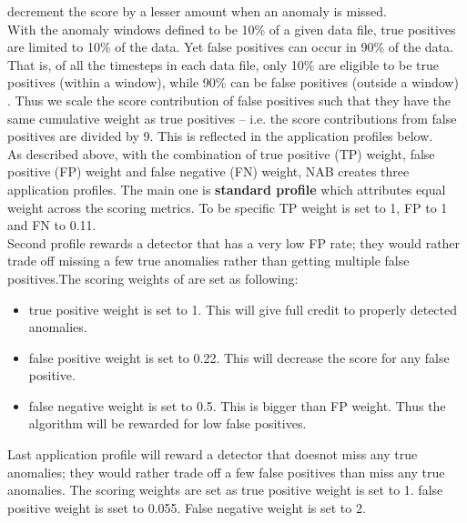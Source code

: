 \documentclass[12pt]{article}
\begin{document}
decrement the score by a lesser amount when an anomaly is missed.\\
\break
With the anomaly windows defined to be 10\% of a given data file, true positives are limited to 10\% of the data. Yet false positives can
occur in 90\% of the data. That is, of all the timesteps in each data file, only 10\%
are eligible to be true positives (within a window), while 90\% can be false
positives (outside a window) . Thus we scale the score contribution of false
positives such that they have the same cumulative weight as true positives – i.e.
the score contributions from false positives are divided by 9. This is reflected in
the application profiles below.\\
\break
As described above, with the combination of true positive (TP) weight, false positive (FP) weight and false negative (FN) weight, NAB creates three application profiles. The main one is \textbf{standard profile} which attributes equal weight
across the scoring metrics. To be specific TP weight is set to 1, FP to 1 and FN to 0.11. \\
\break
Second profile rewards a detector that has a
very low FP rate; they would rather trade off missing a few true anomalies rather
than getting multiple false positives.The scoring weights of are set as following:
\begin{itemize}
\item true positive weight is set to 1. This will give full credit to properly detected anomalies. 
\item false positive weight is set to 0.22. This will decrease the score for any false positive.
\item false negative weight is set to 0.5. This is bigger than FP weight. Thus the algorithm will be rewarded for low false positives.
\end{itemize}
Last application profile will reward a detector that doesnot
miss any true anomalies; they would rather trade off a few false positives than
miss any true anomalies. The scoring weights are set as true positive weight is set to 1. false positive weight is sset to 0.055. False negative weight is set to 2.\\
\break
\end{document}
